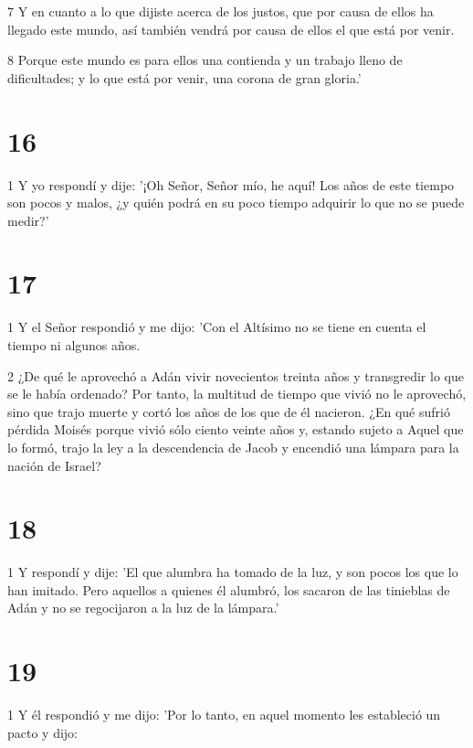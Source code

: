 \par 7 Y en cuanto a lo que dijiste acerca de los justos, que por causa de ellos ha llegado este mundo, así también vendrá por causa de ellos el que está por venir.

\par 8 Porque este mundo es para ellos una contienda y un trabajo lleno de dificultades; y lo que está por venir, una corona de gran gloria.'

\chapter{16}

\par 1 Y yo respondí y dije: '¡Oh Señor, Señor mío, he aquí! Los años de este tiempo son pocos y malos, ¿y quién podrá en su poco tiempo adquirir lo que no se puede medir?'

\chapter{17}

\par 1 Y el Señor respondió y me dijo: 'Con el Altísimo no se tiene en cuenta el tiempo ni algunos años.

\par 2 ¿De qué le aprovechó a Adán vivir novecientos treinta años y transgredir lo que se le había ordenado? Por tanto, la multitud de tiempo que vivió no le aprovechó, sino que trajo muerte y cortó los años de los que de él nacieron. ¿En qué sufrió pérdida Moisés porque vivió sólo ciento veinte años y, estando sujeto a Aquel que lo formó, trajo la ley a la descendencia de Jacob y encendió una lámpara para la nación de Israel?

\chapter{18}

\par 1 Y respondí y dije: 'El que alumbra ha tomado de la luz, y son pocos los que lo han imitado. Pero aquellos a quienes él alumbró, los sacaron de las tinieblas de Adán y no se regocijaron a la luz de la lámpara.'

\chapter{19}

\par 1 Y él respondió y me dijo: 'Por lo tanto, en aquel momento les estableció un pacto y dijo:

